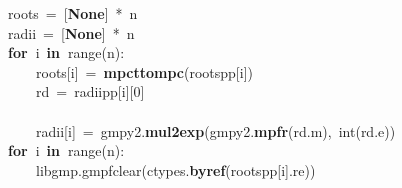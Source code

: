 \documentclass{article}\usepackage[]{graphicx}\usepackage[dvipsnames,table]{xcolor}
\makeatletter
\newcommand{\hlnum}[1]{\textcolor[rgb]{0.686,0.059,0.569}{#1}}%
\newcommand{\hlopt}[1]{\textcolor[rgb]{0,0,0}{#1}}%
\newcommand{\hldef}[1]{\textcolor[rgb]{0.345,0.345,0.345}{#1}}%
\newcommand{\hlkwa}[1]{\textcolor[rgb]{0.161,0.373,0.58}{\textbf{#1}}}%
\newcommand{\hlkwb}[1]{\textcolor[rgb]{0.69,0.353,0.396}{#1}}%
\newcommand{\hlkwd}[1]{\textcolor[rgb]{0.737,0.353,0.396}{\textbf{#1}}}%
\newenvironment{kframe}{%
 \def\at@end@of@kframe{}%
 \ifinner\ifhmode%
  \def\at@end@of@kframe{\end{minipage}}%
  \begin{minipage}{\columnwidth}%
 \fi\fi%
 \def\FrameCommand##1{\hskip\@totalleftmargin \hskip-\fboxsep
 \colorbox{shadecolor}{##1}\hskip-\fboxsep
     \hskip-\linewidth \hskip-\@totalleftmargin \hskip\columnwidth}%
 \MakeFramed {\advance\hsize-\width
   \@totalleftmargin\z@ \linewidth\hsize
   \@setminipage}}%
 {\par\unskip\endMakeFramed%
 \at@end@of@kframe}
\newenvironment{knitrout}{}{} %
\makeatother
\begin{document}
\begin{center}
\begin{minipage}[m]{18cm}
\begin{knitrout}
\begin{kframe}
\hldef{}\hldef{\ \ \ \ }\hldef{roots\ }\hlopt{=\ {[}}\hldef{}\hlkwa{None}\hldef{}\hlopt{{]}\ {*}\ }\hldef{n}\hspace*{\fill}\\
\hldef{}\hldef{\ \ \ \ }\hldef{radii\ }\hlopt{=\ {[}}\hldef{}\hlkwa{None}\hldef{}\hlopt{{]}\ {*}\ }\hldef{n}\hspace*{\fill}\\
\hldef{}\hldef{\ \ \ \ }\hldef{}\hlkwa{for\ }\hldef{i\ }\hlkwa{in\ }\hldef{}\hlkwb{range}\hldef{}\hlopt{(}\hldef{n}\hlopt{):}\hspace*{\fill}\\
\hldef{}\hldef{\ \ \ \ \ \ \ \ }\hldef{roots}\hlopt{{[}}\hldef{i}\hlopt{{]}\ =\ }\hldef{}\hlkwd{mpc\textunderscore t\textunderscore to\textunderscore mpc}\hldef{}\hlopt{(}\hldef{roots\textunderscore pp}\hlopt{{[}}\hldef{i}\hlopt{{]})}\hspace*{\fill}\\
\hldef{}\hldef{\ \ \ \ \ \ \ \ }\hldef{rd\ }\hlopt{=\ }\hldef{radii\textunderscore pp}\hlopt{{[}}\hldef{i}\hlopt{{]}{[}}\hldef{}\hlnum{0}\hldef{}\hlopt{{]}}\hldef{\ \ \ \ \ \ \ \ \ \ \ \ \ \ \ \ \ \ \ \ }\hlopt{}\hldef{}\hspace*{\fill}\\
\hldef{}\hldef{\ \ \ \ \ \ \ \ }\hldef{}\hspace*{\fill}\\
\hldef{}\hldef{\ \ \ \ \ \ \ \ }\hldef{radii}\hlopt{{[}}\hldef{i}\hlopt{{]}\ =\ }\hldef{gmpy2}\hlopt{.}\hldef{}\hlkwd{mul\textunderscore 2exp}\hldef{}\hlopt{(}\hldef{gmpy2}\hlopt{.}\hldef{}\hlkwd{mpfr}\hldef{}\hlopt{(}\hldef{rd}\hlopt{.}\hldef{m}\hlopt{),\ }\hldef{}\hlkwb{int}\hldef{}\hlopt{(}\hldef{rd}\hlopt{.}\hldef{e}\hlopt{))}\hspace*{\fill}\\
\hldef{}\hldef{\ \ \ \ }\hldef{}\hlkwa{for\ }\hldef{i\ }\hlkwa{in\ }\hldef{}\hlkwb{range}\hldef{}\hlopt{(}\hldef{n}\hlopt{):}\hspace*{\fill}\\
\hldef{}\hldef{\ \ \ \ \ \ \ \ }\hldef{\textunderscore libgmp}\hlnum{.\textunderscore \textunderscore }\hldef{gmpf}\hlnum{\textunderscore }\hldef{clear}\hlopt{(}\hldef{ctypes}\hlopt{.}\hldef{}\hlkwd{byref}\hldef{}\hlopt{(}\hldef{roots\textunderscore pp}\hlopt{{[}}\hldef{i}\hlopt{{]}.}\hldef{re}\hlopt{))}\hspace*{\fill}\\

\end{kframe}
\end{knitrout}
\end{minipage}
\end{center}
\end{document}
